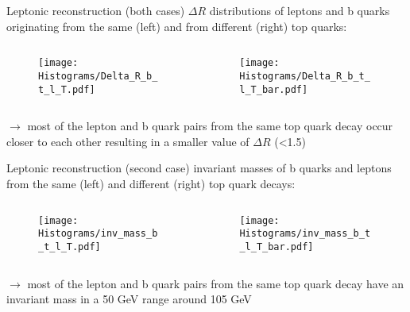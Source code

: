 \documentclass[aspectratio=1610, professionalfonts, 9pt]{beamer}
\begin{document}
\begin{frame}{Leptonic reconstruction (both cases)}
  \(\Delta R\) distributions of leptons and b quarks originating from the same (left) and from different (right) top quarks:
    \begin{columns}
        \begin{column}{0.5\textwidth}
            \begin{figure}
                \centering
                \texttt{[image: Histograms/Delta\_R\_b\_t\_l\_T.pdf]}
                \label{fig:lepto_reco3}
            \end{figure}
        \end{column}
        \begin{column}{0.5\textwidth}
            \begin{figure}
                \centering
                \texttt{[image: Histograms/Delta\_R\_b\_t\_l\_T\_bar.pdf]}
                \label{fig:lepto_reco4}
            \end{figure}
        \end{column}
    \end{columns}
    \(\rightarrow\) most of the lepton and b quark pairs from the same top quark decay occur closer to each other resulting in a smaller value of \(\Delta R\) (<1.5)
\end{frame}

\begin{frame}{Leptonic reconstruction (second case)}
    invariant masses of b quarks and leptons from the same (left) and different (right) top quark decays:
    \begin{columns}
        \begin{column}{0.5\textwidth}
            \begin{figure}
                \centering
                \texttt{[image: Histograms/inv\_mass\_b\_t\_l\_T.pdf]}
                \label{fig:lepto_reco5}
            \end{figure}
        \end{column}
        \begin{column}{0.5\textwidth}
            \begin{figure}
                \centering
                \texttt{[image: Histograms/inv\_mass\_b\_t\_l\_T\_bar.pdf]}
                \label{fig:lepto_reco6}
            \end{figure}
        \end{column}
    \end{columns}
    \(\rightarrow\) most of the lepton and b quark pairs from the same top quark decay have an invariant mass in a 50 GeV range around 105 GeV
\end{frame}
\end{document}
